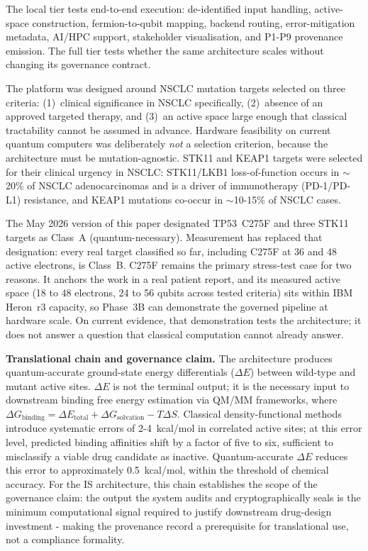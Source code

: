 \documentclass[11pt,letterpaper]{article}
\begin{document}
The local tier tests end-to-end execution: de-identified input handling, active-space
construction, fermion-to-qubit mapping, backend routing, error-mitigation metadata, AI/HPC
support, stakeholder visualisation, and P1-P9 provenance emission.  The full tier tests
whether the same architecture scales without changing its governance contract.

The platform was designed around NSCLC mutation targets selected on three criteria:
(1)~clinical significance in NSCLC specifically, (2)~absence of an approved targeted therapy,
and (3)~an active space large enough that classical tractability cannot be assumed in advance.
Hardware feasibility on current quantum computers was deliberately \emph{not} a selection
criterion, because the architecture must be mutation-agnostic.  STK11 and KEAP1 targets were
selected for their clinical urgency in NSCLC: STK11/LKB1 loss-of-function occurs in
$\sim$20\% of NSCLC adenocarcinomas and is a driver of immunotherapy (PD-1/PD-L1) resistance,
and KEAP1 mutations co-occur in $\sim$10-15\% of NSCLC cases.

The May 2026 version of this paper designated TP53~C275F and three STK11 targets as Class~A
(quantum-necessary).  Measurement has replaced that designation: every real target classified
so far, including C275F at 36 and 48 active electrons, is Class~B.  C275F remains the primary
stress-test case for two reasons.  It anchors the work in a real patient report, and its
measured active space (18 to 48 electrons, 24 to 56 qubits across tested criteria) sits within
IBM Heron~r3 capacity, so Phase~3B can demonstrate the governed pipeline at hardware scale.
On current evidence, that demonstration tests the architecture; it does not answer a question
that classical computation cannot already answer.

\textbf{Translational chain and governance claim.}  The architecture produces
quantum-accurate ground-state energy differentials ($\Delta E$) between wild-type and
mutant active sites.  $\Delta E$ is not the terminal output; it is the necessary input to
downstream binding free energy estimation via QM/MM frameworks, where
$\Delta G_{\text{binding}} = \Delta E_{\text{total}} + \Delta G_{\text{solvation}} -
T\Delta S$.  Classical density-functional methods introduce systematic errors of
2-4~kcal/mol in correlated active sites; at this error level, predicted binding affinities
shift by a factor of five to six, sufficient to misclassify a viable drug candidate as
inactive.  Quantum-accurate $\Delta E$ reduces this error to approximately 0.5~kcal/mol,
within the threshold of chemical accuracy.  For the IS architecture, this chain establishes
the scope of the governance claim: the output the system audits and cryptographically seals
is the minimum computational signal required to justify downstream drug-design
investment - making the provenance record a prerequisite for translational use, not a
compliance formality.
\end{document}
